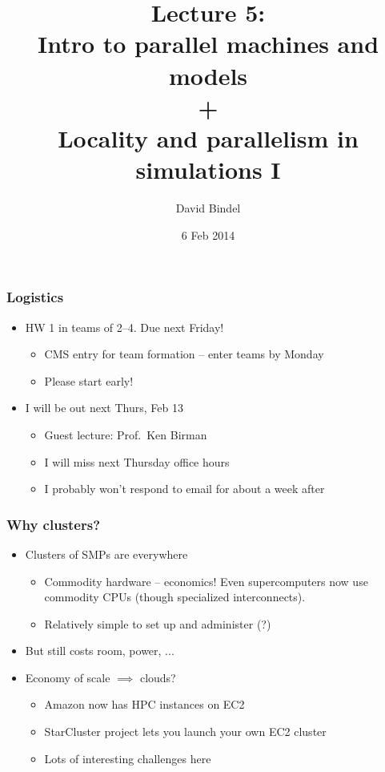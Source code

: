 \documentclass{beamer}
\title[CS 5220, Spring 2014]{Lecture 5: \\
  Intro to parallel machines and models \\
  + \\
  Locality and parallelism in simulations I}
\author[]{David Bindel} \date[]{6 Feb 2014}
\begin{document}
\begin{frame}
  \titlepage
\end{frame}


\begin{frame}
  \frametitle{Logistics}
  
  \begin{itemize}
  \item HW 1 in teams of 2--4.  Due next Friday!
    \begin{itemize}
    \item CMS entry for team formation -- enter teams by Monday
    \item Please start early!
    \end{itemize}
  \item I will be out next Thurs, Feb 13
    \begin{itemize}
    \item Guest lecture: Prof.~Ken Birman
    \item I will miss next Thursday office hours
    \item I probably won't respond to email for about a week after
    \end{itemize}
  \end{itemize}
\end{frame}


\begin{frame}
  \frametitle{Why clusters?}

  \begin{itemize}
  \item Clusters of SMPs are everywhere
    \begin{itemize}
    \item Commodity hardware -- economics!  Even supercomputers
      now use commodity CPUs (though specialized interconnects).
    \item Relatively simple to set up and administer (?)
    \end{itemize}
  \item But still costs room, power, ...
  \item Economy of scale $\implies$ clouds?
    \begin{itemize}
    \item Amazon now has HPC instances on EC2
    \item StarCluster project lets you launch your own EC2 cluster
    \item Lots of interesting challenges here
    \end{itemize}
  \end{itemize}
\end{frame}
\end{document}
